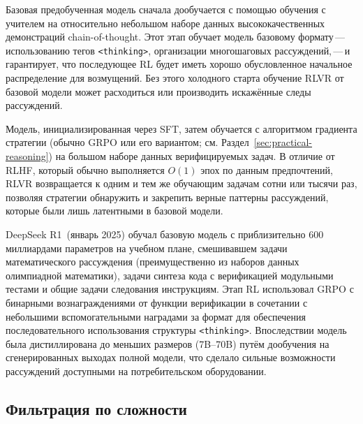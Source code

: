 \begin{description}[leftmargin=!,labelwidth=3.5cm]
\item[Этап~1: Холодный старт SFT] Базовая предобученная модель сначала
  дообучается с помощью обучения с учителем на относительно небольшом наборе данных
  высококачественных демонстраций chain-of-thought. Этот этап обучает модель
  базовому формату\,---\,использованию тегов \texttt{<thinking>},
  организации многошаговых рассуждений,\,---\,и гарантирует, что
  последующее RL будет иметь хорошо обусловленное начальное распределение для возмущений.
  Без этого холодного старта обучение RLVR от базовой модели может расходиться
  или производить искажённые следы рассуждений.

\item[Этап~2: Крупномасштабный RLVR] Модель, инициализированная через SFT, затем
  обучается с алгоритмом градиента стратегии (обычно GRPO или его
  вариантом; см. Раздел~\ref{sec:practical-reasoning}) на большом
  наборе данных верифицируемых задач. В отличие от RLHF, который обычно выполняется
  $O(1)$ эпох по данным предпочтений, RLVR возвращается к одним и тем же
  обучающим задачам сотни или тысячи раз, позволяя
  стратегии обнаружить и закрепить верные паттерны рассуждений, которые были
  лишь латентными в базовой модели.
\end{description}

\begin{example}
\label{ex:deepseek-r1}
DeepSeek R1~(январь 2025) обучал базовую модель с приблизительно
600 миллиардами параметров на учебном плане, смешивавшем задачи математического
рассуждения (преимущественно из наборов данных олимпиадной математики),
задачи синтеза кода с верификацией модульными тестами и общие
задачи следования инструкциям. Этап RL использовал GRPO с бинарными
вознаграждениями от функции верификации в сочетании с небольшими вспомогательными
наградами за формат для обеспечения последовательного использования структуры \texttt{<thinking>}.
Впоследствии модель была дистиллирована до меньших размеров
(7B--70B) путём дообучения на сгенерированных выходах полной модели, что сделало
сильные возможности рассуждений доступными на потребительском оборудовании.
\end{example}

\subsection{Фильтрация по сложности}
\label{subsec:difficulty-filtering}

